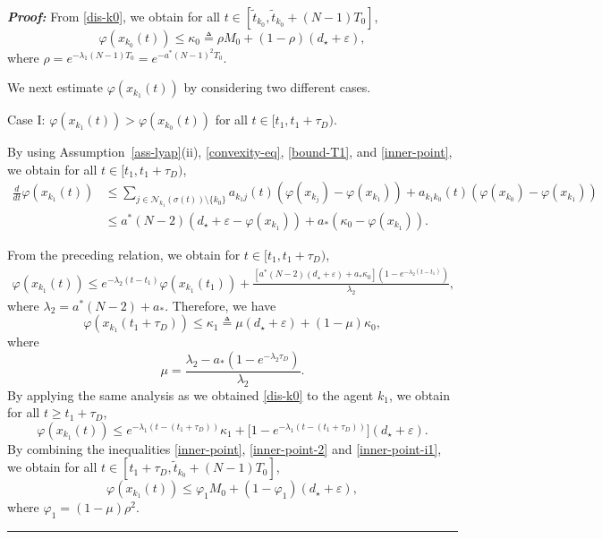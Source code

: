 \documentclass[a4paper, 11pt]{article}
\def \defn{\triangleq}
\newenvironment{IEEEproof}[1][\bf Proof]{\smallskip\par\noindent\textit{#1: }}{\hspace*{\fill} \rule{6pt}{6pt}\smallskip}
\newcommand{\eps}{\varepsilon}
\begin{document}
\begin{IEEEproof}
From \eqref{dis-k0}, we obtain for all $t \in [\tilde{t}_{k_0},\tilde{t}_{k_0}+(N-1)T_0]$,
\begin{equation}\label{inner-point}
\varphi(x_{k_0}(t))  \leq \kappa_0 \defn \rho M_0+(1-\rho)(d_\star+\eps),
\end{equation}
where $\rho=e^{-\lambda_1(N-1)T_0}=e^{-a^* (N-1)^2 T_0}$.


We next estimate $\varphi(x_{k_1}(t))$ by considering two different cases.

Case I: $\varphi(x_{k_1}(t))>\varphi(x_{k_0}(t))$ for all $t \in [t_1,t_1+\tau_D)$.

By using Assumption~\ref{ass-lyap}(ii), \eqref{convexity-eq}, \eqref{bound-T1}, and \eqref{inner-point}, we obtain for all $t \in [t_1,t_1+\tau_D)$,
\begin{align*}
\frac{d}{dt} \varphi(x_{k_1}(t)) & \leq \sum _{j \in \mathcal{N}_{k_1}(\sigma(t)) \setminus \{k_0\}}
a_{k_1 j}(t)\left(\varphi(x_{k_j})-\varphi(x_{k_1})\right) +
a_{k_1 k_0}(t)(\varphi(x_{k_0})-\varphi(x_{k_1}))\\
& \leq a^*(N-2) (d_\star+\eps -\varphi(x_{k_1}))+a_*\left(\kappa_0-\varphi(x_{k_1})\right).
\end{align*}

From the preceding relation, we obtain for $t \in [t_1,t_1+\tau_D)$,
\begin{align*}
\varphi(x_{k_1}(t)) \leq e^{-\lambda_2 (t-t_1)}  \varphi(x_{k_1}(t_1))+\frac{\left[a^*(N-2)(d_\star+\eps)+a_*\kappa_0\right](1-e^{-\lambda_2(t-t_1)})}{\lambda_2},
\end{align*}
where $\lambda_2=a^*(N-2)+a_*$.
Therefore, we have
\begin{equation}\label{inner-point-2}
\varphi(x_{k_1}(t_1+\tau_D)) \leq \kappa_1  \defn \mu(d_\star+\eps)+(1-\mu)\kappa_0,
\end{equation}
where
\begin{equation}\label{def-mu}
\mu=\frac{\lambda_2-a_*(1-e^{-\lambda_2\tau_D})}{\lambda_2}.
\end{equation}
By applying the same analysis as we obtained \eqref{dis-k0} to the agent $k_1$,
we obtain for all $t \geq t_1+\tau_D$,
\begin{equation}\label{inner-point-i1}
\varphi(x_{k_1}(t))  \leq e^{-\lambda_1(t-(t_1+\tau_D))}\kappa_1+\Big[1- e^{-\lambda_1(t-(t_1+\tau_D))}\Big](d_\star+\eps).
\end{equation}
By combining the inequalities \eqref{inner-point}, \eqref{inner-point-2} and \eqref{inner-point-i1}, we obtain for all $t \in [t_1+\tau_D, \tilde{t}_{k_0}+(N-1)T_0]$,
\begin{equation}\label{inner-key}
\varphi(x_{k_1}(t))  \leq \varphi_1 M_0+(1-\varphi_1)(d_\star+\eps),
\end{equation}
where $\varphi_1=(1-\mu)\rho^2 $.


\end{IEEEproof}
\end{document}
